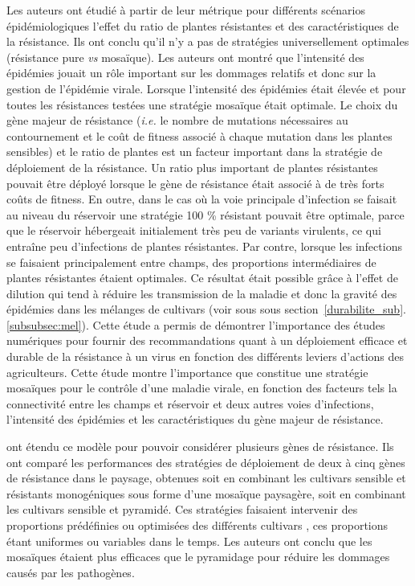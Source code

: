 	Les auteurs ont étudié à partir de leur métrique pour différents scénarios épidémiologiques l'effet du ratio de plantes résistantes et des caractéristiques de la résistance. 
Ils ont conclu qu'il n'y a pas de stratégies universellement optimales (résistance pure \textit{vs} mosaïque).
 Les auteurs ont montré que l'intensité des épidémies jouait un rôle important sur les dommages relatifs et donc sur la  gestion de l'épidémie virale.
Lorsque l'intensité des épidémies était élevée et pour toutes les résistances testées une stratégie mosaïque était optimale.
Le choix du gène majeur de résistance (\textit{i.e.} le nombre de mutations nécessaires au contournement et le coût de fitness associé à chaque mutation dans les plantes sensibles) et le ratio de plantes est un facteur important dans la stratégie de déploiement de la résistance. Un ratio plus important  de plantes résistantes pouvait être déployé lorsque le gène de résistance était associé à de très forts coûts de fitness. En outre, dans le cas où la voie principale d'infection se faisait au niveau du réservoir une stratégie 100 \% résistant pouvait être optimale, parce que le réservoir hébergeait initialement très peu de variants virulents, ce qui entraîne peu d'infections de plantes résistantes. Par contre, lorsque les infections se faisaient principalement entre champs, des proportions intermédiaires de plantes résistantes étaient optimales. Ce résultat était possible grâce à l'effet de dilution qui tend à réduire les transmission de la maladie et donc la gravité des épidémies dans les mélanges de cultivars (voir sous sous section~\ref{durabilite_sub}.\ref{subsubsec:mel}). 
Cette étude a permis de démontrer l'importance des études numériques pour fournir des recommandations quant à un déploiement efficace et durable de la résistance à un virus en fonction des différents leviers d'actions des agriculteurs. Cette étude montre l'importance que constitue une stratégie mosaïques pour le contrôle d’une
maladie virale, en fonction des facteurs tels la connectivité entre les champs et réservoir et deux autres voies d'infections, l’intensité des épidémies et les caractéristiques du gène majeur de résistance. 
	
	\citet{Djidjou-Demasse2017} ont étendu ce modèle pour pouvoir considérer plusieurs gènes de résistance. Ils ont comparé les performances des stratégies de déploiement de deux à cinq gènes de résistance dans le paysage, obtenues soit en combinant les cultivars sensible et résistants monogéniques sous forme d'une mosaïque paysagère, soit en combinant les cultivars sensible et pyramidé. Ces stratégies faisaient intervenir des proportions prédéfinies ou optimisées des différents cultivars , ces proportions étant uniformes ou variables dans le temps.
Les auteurs ont conclu que les mosaïques étaient plus efficaces que le  pyramidage pour réduire les dommages causés par les pathogènes.
	
